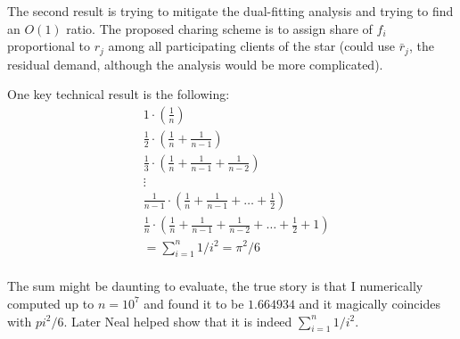 \documentclass{article}
\begin{document}
The second result is trying to mitigate the dual-fitting analysis and
trying to find an $O(1)$ ratio. The proposed charing scheme is to
assign share of $f_i$ proportional to $r_j$ among all participating
clients of the star (could use $\bar r_j$, the residual demand,
although the analysis would be more complicated).

One key technical result is the following:
\begin{align*}
  &1\cdot \left( \frac{1}{n} \right)\\
  &\frac{1}{2} \cdot \left( \frac{1}{n} + \frac{1}{n-1} \right)\\
  &\frac{1}{3} \cdot \left( \frac{1}{n} + \frac{1}{n-1} + \frac{1}{n-2} \right)\\
  &\vdots\\
  &\frac{1}{n-1} \cdot \left( \frac{1}{n} + \frac{1}{n-1} + \ldots + \frac{1}{2} \right)\\
  &\frac{1}{n} \cdot \left( \frac{1}{n} + \frac{1}{n-1} + \frac{1}{n-2} + \ldots + \frac{1}{2} + 1 \right)\\
  &= \sum_{i=1}^n 1/i^2 = \pi^2/6\\
\end{align*}

The sum might be daunting to evaluate, the true story is that I
numerically computed up to $n=10^7$ and found it to be $1.664934$ and
it magically coincides with $pi^2/6$. Later Neal helped show that it
is indeed $\sum_{i=1}^n 1/i^2$.
\end{document}

